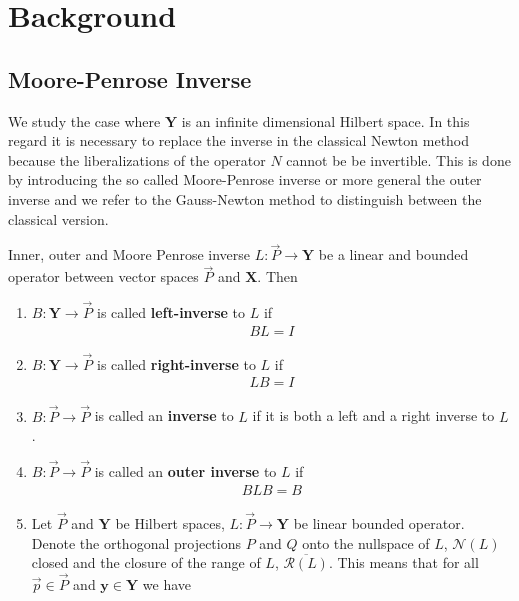 \section{Background}
\subsection{Moore-Penrose Inverse}
We study the case where $\mathbf{Y}$ is an infinite dimensional Hilbert
space. In this regard it is necessary to replace the inverse in the classical
Newton method because the liberalizations of the operator $N$ cannot be be
invertible. This is done by introducing the so called Moore-Penrose inverse
or more general the outer inverse and we refer to the Gauss-Newton method to
distinguish between the classical version.
\begin{mydef}{Inner, outer and Moore Penrose inverse}
    $L: \vec{P} \to \mathbf{Y}$ be a linear and bounded operator between
    vector spaces $\vec{P}$ and $\mathbf{X}$. Then
    \begin{enumerate}
        \item $B: \mathbf{Y} \to \vec{P}$ is called \textbf{left-inverse} to
            $L$ if
            \begin{align}
                BL = I
            \end{align}
        \item $B: \mathbf{Y} \to \vec{P}$ is called \textbf{right-inverse} to
            $L$ if
            \begin{align}
                LB = I
            \end{align}
        \item $B: \vec{P} \to \vec{P}$ is called an \textbf{inverse} to
            $L$ if it is both a left and a right inverse to $L$.
        \item $B: \vec{P} \to \vec{P}$ is called an \textbf{outer inverse} to
            $L$ if
            \begin{align}
                BLB = B
            \end{align}
        \item Let $\vec{P}$ and $\mathbf{Y}$ be Hilbert spaces, $L: \vec{P}
            \to \mathbf{Y}$ be linear bounded operator. Denote the
            orthogonal projections $P$ and $Q$ onto the nullspace of $L$,
            $\mathcal{N}(L)$ closed and the closure of the range of $L$,
            $\overline{\mathcal{R}\left(L  \right)} $. This means that for all $\vec{p}
            \in \vec{P}$ and $\mathbf{y} \in \mathbf{Y}$ we have

\end{enumerate}
\end{mydef}
